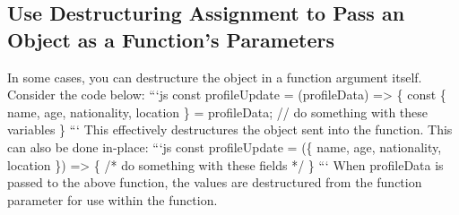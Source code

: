 \documentclass{article}%
\begin{document}
%
\subsection{Use Destructuring Assignment to Pass an Object as a Function's Parameters}%
\label{subsec:UseDestructuringAssignmenttoPassanObjectasaFunctionsParameters}%
In some cases, you can destructure the object in a function argument itself.\newline%
Consider the code below:\newline%
```js\newline%
const profileUpdate = (profileData) => \{\newline%
  const \{ name, age, nationality, location \} = profileData;\newline%
  // do something with these variables\newline%
\}\newline%
```\newline%
This effectively destructures the object sent into the function. This can also be done in{-}place:\newline%
```js\newline%
const profileUpdate = (\{ name, age, nationality, location \}) => \{\newline%
  /* do something with these fields */\newline%
\}\newline%
```\newline%
When profileData is passed to the above function, the values are destructured from the function parameter for use within the function.\newline%

%
\end{document}
